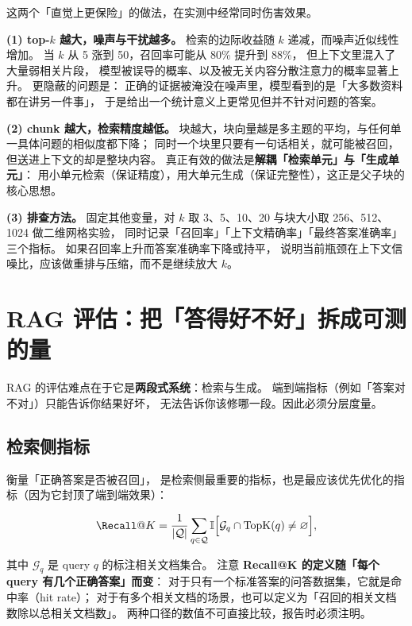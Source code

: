 \begin{pitfall}
这两个「直觉上更保险」的做法，在实测中经常同时伤害效果。

\textbf{(1) top-$k$ 越大，噪声与干扰越多。}
检索的边际收益随 $k$ 递减，而噪声近似线性增加。
当 $k$ 从 5 涨到 50，召回率可能从 80\% 提升到 88\%，
但上下文里混入了大量弱相关片段，
模型被误导的概率、以及被无关内容分散注意力的概率显著上升。
更隐蔽的问题是：
正确的证据被淹没在噪声里，模型看到的是「大多数资料都在讲另一件事」，
于是给出一个统计意义上更常见但并不针对问题的答案。

\textbf{(2) chunk 越大，检索精度越低。}
块越大，块向量越是多主题的平均，与任何单一具体问题的相似度都下降；
同时一个块里只要有一句话相关，就可能被召回，但送进上下文的却是整块内容。
真正有效的做法是\textbf{解耦「检索单元」与「生成单元」}：
用小单元检索（保证精度），用大单元生成（保证完整性），这正是父子块的核心思想。

\textbf{(3) 排查方法。}
固定其他变量，对 $k$ 取 3、5、10、20 与块大小取 256、512、1024 做二维网格实验，
同时记录「召回率」「上下文精确率」「最终答案准确率」三个指标。
如果召回率上升而答案准确率下降或持平，
说明当前瓶颈在上下文信噪比，应该做重排与压缩，而不是继续放大 $k$。
\end{pitfall}

\section{RAG 评估：把「答得好不好」拆成可测的量}

RAG 的评估难点在于它是\textbf{两段式系统}：检索与生成。
端到端指标（例如「答案对不对」）只能告诉你结果好坏，
无法告诉你该修哪一段。因此必须分层度量。

\subsection{检索侧指标}

 衡量「正确答案是否被召回」，
是检索侧最重要的指标，也是最应该优先优化的指标（因为它封顶了端到端效果）：

\begin{equation}
\Recall@K = \frac{1}{|\mathcal{Q}|} \sum_{q \in \mathcal{Q}}
\mathbb{I}\Big[ \mathcal{G}_q \cap \text{TopK}(q) \ne \varnothing \Big] ,
\label{eq:recall-at-k}
\end{equation}

其中 $\mathcal{G}_q$ 是 query $q$ 的标注相关文档集合。
注意 \textbf{Recall@K 的定义随「每个 query 有几个正确答案」而变}：
对于只有一个标准答案的问答数据集，它就是命中率（hit rate）；
对于有多个相关文档的场景，也可以定义为「召回的相关文档数除以总相关文档数」。
两种口径的数值不可直接比较，报告时必须注明。

